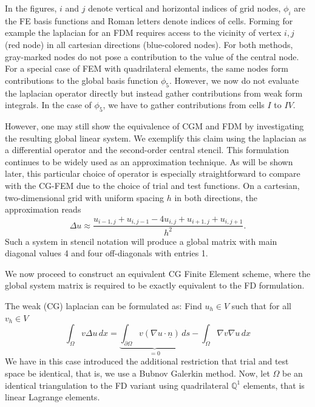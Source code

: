 \documentclass[asi,article,submit,moreauthors]{Definitions/mdpi}
\begin{document}
In the figures, $i$ and $j$ denote vertical and horizontal indices of grid nodes, $\phi_i$ are the FE basis functions and Roman letters denote indices of cells.
Forming for example the laplacian for an FDM requires access to the vicinity of vertex $i,j$ (red node) in all cartesian directions (blue-colored nodes). For both methods, gray-marked nodes do not pose a contribution to the value of the central node. For a special case of FEM with quadrilateral elements, the same nodes form contributions to the global basis function $\phi_5$. However, we now do not evaluate the laplacian operator directly but instead gather contributions from weak form integrals. In the case of $\phi_5$, we have to gather contributions from cells $I$ to $IV$.

However, one may still show the equivalence of CGM and FDM by investigating the resulting global linear system.
We exemplify this claim using the laplacian as a differential operator and the second-order central stencil.
This formulation continues to be widely used as an approximation technique.
As will be shown later, this particular choice of operator is especially straightforward to compare with the CG-FEM due to the choice of trial and test functions.
On a cartesian, two-dimensional grid with uniform spacing $h$ in both directions, the approximation reads
\begin{equation}\label{eq:fd-laplacian}
    \Delta u \approx \frac{u_{i-1,j}+u_{i,j-1}-4u_{i,j}+u_{i+1,j}+u_{i,j+1}}{h^2}.
\end{equation}
Such a system in stencil notation will produce a global matrix with main diagonal values 4 and four off-diagonals with entries 1.

We now proceed to construct an equivalent CG Finite Element scheme, where the global system matrix is required to be exactly equivalent to the FD formulation.

The weak (CG) laplacian can be formulated as: Find $u_h \in V$ such that for all $v_h \in V$
\begin{equation}
    \int_\Omega v \Delta u \,dx = \underbrace{\int_{\partial\Omega} v (\nabla u \cdot \underline{n}) \,ds}_{=0} - \int_\Omega \nabla v \nabla u \,dx
\end{equation}
We have in this case introduced the additional restriction that trial and test space be identical, that is, we use a Bubnov Galerkin method.
Now, let $\Omega$ be an identical triangulation to the FD variant using quadrilateral $\mathbb{Q}^1$ elements, that is linear Lagrange elements.
\end{document}
